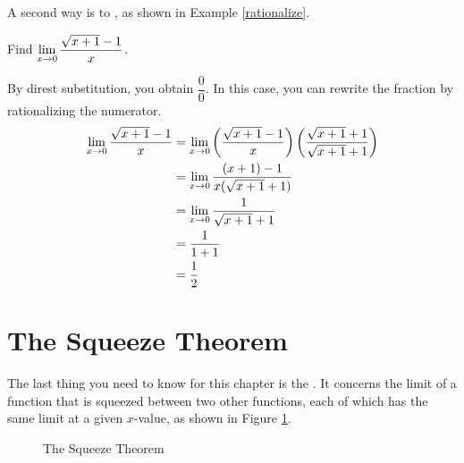 A second way is to , as shown in Example \ref{rationalize}.\\

\begin{example}
    Find $\displaystyle\lim\limits_{x\to 0}\dfrac{\sqrt{x+1}-1}{x}$. \cite{ci}
    \begin{solution}
        By direst substitution, you obtain $\dfrac{0}{0}$. In this case, you can rewrite the fraction by rationalizing the numerator.
        \begin{align*}
            \displaystyle\lim\limits_{x\to 0}\dfrac{\sqrt{x+1}-1}{x}
            &=\displaystyle\lim\limits_{x\to 0}\left(\dfrac{\sqrt{x+1}-1}{x}\right)\left(\dfrac{\sqrt{x+1}+1}{\sqrt{x+1}+1}\right)\\
            &=\displaystyle\lim\limits_{x\to 0}\dfrac{(x+1)-1}{x(\sqrt{x+1}+1)}\\
            &=\displaystyle\lim\limits_{x\to 0}\dfrac{1}{\sqrt{x+1}+1}\\
            &=\dfrac{1}{1+1}\\
            &=\dfrac{1}{2}
        \end{align*}
    \end{solution}
    \label{rationalize}
\end{example}

\section{The Squeeze Theorem}
The last thing you need to know for this chapter is the . It concerns the limit of a function that is squeezed between two other functions, each of which has the same limit at a given $x$-value, as shown in Figure \ref{sqeeze}.

\begin{figure}[H]
    \centering
    \caption{The Squeeze Theorem}
    \label{sqeeze}
\end{figure}

